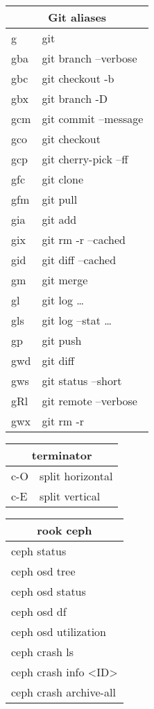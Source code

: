 \documentclass[12pt,paper=landscape,paper=a4]{scrartcl}
\begin{document}
\pagestyle{empty}

\begin{multicols}{3}

    \begin{tabular}{ll}
        \multicolumn{2}{c}{Git aliases} \\
        \hline
        g    & git\\
        gba  & git branch --verbose\\
        gbc  & git checkout -b\\
        gbx  & git branch -D\\
        gcm  & git commit --message\\
        gco  & git checkout\\
        gcp  & git cherry-pick --ff\\
        gfc  & git clone\\
        gfm  & git pull\\
        gia  & git add\\
        gix  & git rm -r --cached\\
        gid  & git diff --cached\\
        gm   & git merge\\
        gl   & git log \ldots\\
        gls  & git log --stat \ldots\\
        gp   & git push\\
        gwd  & git diff\\
        gws  & git status --short\\
        gRl  & git remote --verbose\\
        gwx  & git rm -r
    \end{tabular}

    \vspace{1em}

    \begin{tabular}{ll}
        \multicolumn{2}{c}{terminator}\\
        \hline
        c-O & split horizontal\\
        c-E & split vertical
    \end{tabular}

    \vspace{1em}

    \begin{tabular}{l}
        \multicolumn{1}{c}{rook ceph}\\
        \hline
        ceph status\\
        ceph osd tree\\
        ceph osd status\\
        ceph osd df\\
        ceph osd utilization\\
        ceph crash ls\\
        ceph crash info \textless{}ID\textgreater\\
        ceph crash archive-all\\
    \end{tabular}


\end{multicols}
\end{document}
